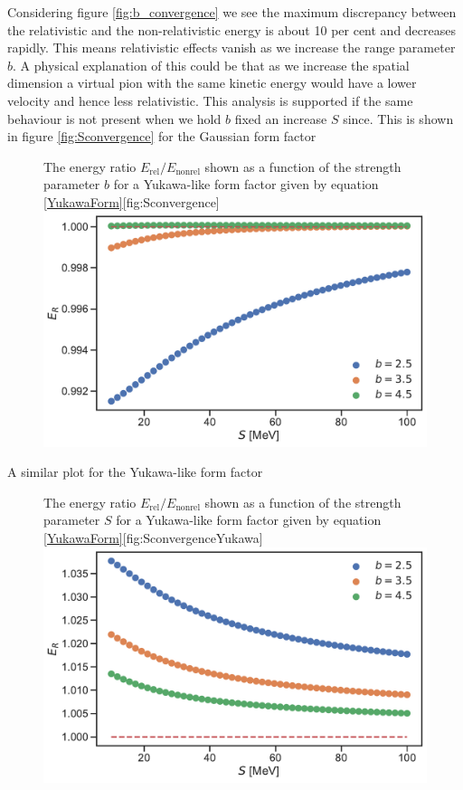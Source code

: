 Considering figure \ref{fig:b_convergence} we see the maximum discrepancy between the relativistic and the non-relativistic energy is about 10 per cent and decreases rapidly. This means relativistic effects vanish as we increase the range parameter $b$. A physical explanation of this could be that as we increase the spatial dimension a virtual pion with the same kinetic energy would have a lower velocity and hence less relativistic. This analysis is supported if the same behaviour is not present when we hold $b$ fixed an increase $S$ since. This is shown in figure \ref{fig:Sconvergence} for the Gaussian form factor 
\begin{figure}[H]
	\begin{sidecaption}{The energy ratio $E_\text{rel}/E_\text{nonrel}$ shown as a function of the strength parameter $b$ for a Yukawa-like form factor given by equation \eqref{YukawaForm}}[fig:Sconvergence]
		\includegraphics[width=\linewidth]{Figures/Sconvergence.pdf}
	\end{sidecaption}
\end{figure}
A similar plot for the Yukawa-like form factor 
\begin{figure}[H]
	\begin{sidecaption}{The energy ratio $E_\text{rel}/E_\text{nonrel}$ shown as a function of the strength parameter $S$ for a Yukawa-like form factor given by equation \eqref{YukawaForm}}[fig:SconvergenceYukawa]
		\includegraphics[width=\linewidth]{Figures/SconvergenceYukawa.pdf}
	\end{sidecaption}
\end{figure}

